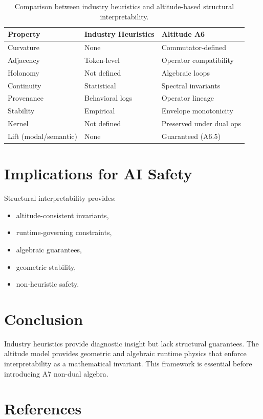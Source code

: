 \documentclass[11pt]{article}
\begin{document}
\begin{table}[h]
\centering
\begin{tabular}{lll}
\toprule
\textbf{Property} & \textbf{Industry Heuristics} & \textbf{Altitude A6} \\
\midrule
Curvature & None & Commutator-defined \\
Adjacency & Token-level & Operator compatibility \\
Holonomy & Not defined & Algebraic loops \\
Continuity & Statistical & Spectral invariants \\
Provenance & Behavioral logs & Operator lineage \\
Stability & Empirical & Envelope monotonicity \\
Kernel & Not defined & Preserved under dual ops \\
Lift (modal/semantic) & None & Guaranteed (A6.5) \\
\bottomrule
\end{tabular}
\caption{Comparison between industry heuristics and altitude-based structural
interpretability.}
\end{table}

\section{Implications for AI Safety}

Structural interpretability provides:
\begin{itemize}
  \item altitude-consistent invariants,
  \item runtime-governing constraints,
  \item algebraic guarantees,
  \item geometric stability,
  \item non-heuristic safety.
\end{itemize}

\section{Conclusion}

Industry heuristics provide diagnostic insight but lack structural guarantees.
The altitude model provides geometric and algebraic runtime physics that enforce
interpretability as a mathematical invariant. This framework is essential before
introducing A7 non-dual algebra.

\section*{References}
\end{document}
